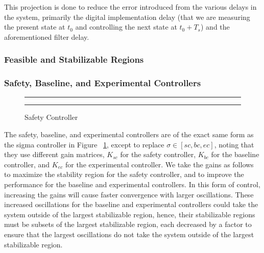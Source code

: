 \documentclass[conference]{IEEEtran}
\begin{document}
This projection is done to reduce the error introduced from the various delays in the system, primarily the digital implementation delay (that we are measuring the present state at $t_0$ and controlling the next state at $t_0+T_s$) and the aforementioned filter delay.

\subsubsection{Feasible and Stabilizable Regions}


\subsubsection{Safety, Baseline, and Experimental Controllers}

\begin{figure}[h!]
\centering
  \hrule
  {}
  \hrule
  \caption{Safety Controller}
  \label{fig:safetyController}
\end{figure}

The safety, baseline, and experimental controllers are of the exact same form as the sigma controller in Figure ~\ref{fig:safetyController}, except to replace $\sigma\in\left[sc,bc,ec\right]$, noting that they use different gain matrices, $K_{sc}$ for the safety controller, $K_{bc}$ for the baseline controller, and $K_{ec}$ for the experimental controller.  We take the gains as follows to maximize the stability region for the safety controller, and to improve the performance for the baseline and experimental controllers.  In this form of control, increasing the gains will cause faster convergence with larger oscillations.  These increased oscillations for the baseline and experimental controllers could take the system outside of the largest stabilizable region, hence, their stabilizable regions must be subsets of the largest stabilizable region, each decreased by a factor to ensure that the largest oscillations do not take the system outside of the largest stabilizable region.
\end{document}
